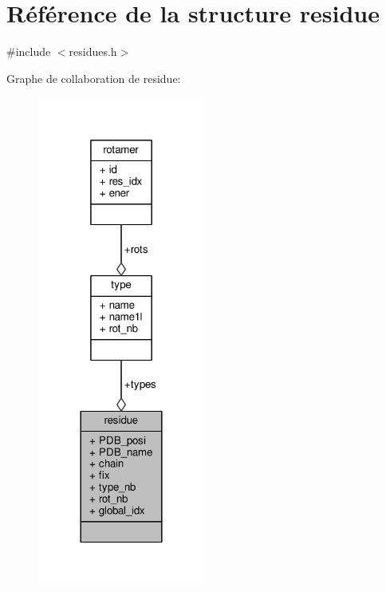 \hypertarget{structresidue}{\section{Référence de la structure residue}
\label{structresidue}
}


{\ttfamily \#include $<$residues.\+h$>$}



Graphe de collaboration de residue\+:\nopagebreak
\begin{figure}[H]
\begin{center}
\leavevmode
\includegraphics[width=156pt]{structresidue__coll__graph}
\end{center}
\end{figure}
